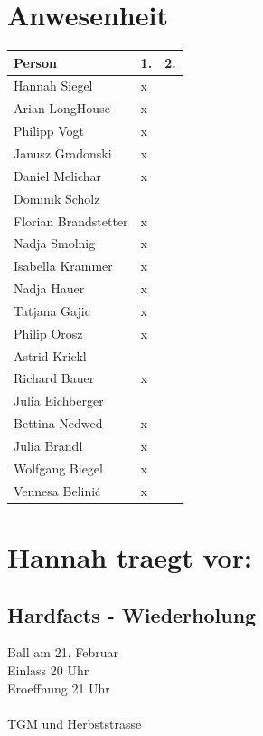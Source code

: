 \documentclass[12pt]{article}
\begin{document}
\ofoot{\pagemark }

\section{Anwesenheit}
  \begin{tabular}{ | p{} | p{} |  p{} |}
    \hline
\textbf{Person} & \textbf{1.} & \textbf{2.}  \\ 
    \hline 
    \hline
 
Hannah Siegel & x & \\ \hline
Arian LongHouse & x & \\ \hline
Philipp Vogt & x & \\ \hline
Janusz Gradonski & x & \\ \hline
Daniel Melichar & x & \\ \hline
Dominik Scholz & & \\ \hline
Florian Brandstetter & x & \\ \hline
Nadja Smolnig & x & \\ \hline
Isabella Krammer & x & \\ \hline
Nadja Hauer & x & \\ \hline
Tatjana Gajic & x & \\ \hline
Philip Orosz & x & \\ \hline
Astrid Krickl & & \\ \hline
Richard Bauer & x & \\ \hline
Julia Eichberger & & \\ \hline
Bettina Nedwed & x & \\ \hline
Julia Brandl & x & \\ \hline
Wolfgang Biegel  & x & \\ \hline
Vennesa Belinić & x & \\ \hline
    \hline
  \end{tabular}
\newpage
\section{Hannah traegt vor:}
\subsection{Hardfacts - Wiederholung}
Ball am 21. Februar \\
Einlass 20 Uhr \\
Eroeffnung 21 Uhr\\ \\
TGM und Herbststrasse
\end{document}
